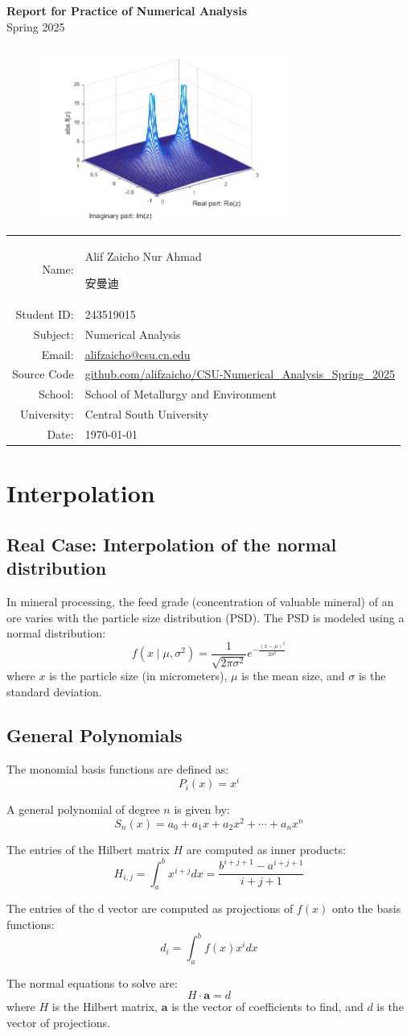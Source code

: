 \documentclass[10pt]{article}
\makeatletter
\newcommand{\makecover}{
  \thispagestyle{empty}
  \begin{center}
    \vspace*{1cm}
    {\LARGE \textbf{Report for Practice of Numerical Analysis}} \\
    \vspace{0.5cm}
    {\Large Spring 2025} \\
    \vspace{2cm}
    
    \begin{figure}[h!]
    \centering
    \includegraphics[width=0.75\textwidth]{figures/anum.png} %
    \end{figure}
    
    \vspace{2cm}
    
    \begin{tabular}{rl}
    \large Name: & \large Alif Zaicho Nur Ahmad \begin{CJK}{UTF8}{gbsn}安曼迪\end{CJK} \\
    \large Student ID: & \large 243519015 \\
    \large Subject: & \large Numerical Analysis \\
    \large Email: & \large \href{mailto:alifzaicho@csu.cn.edu}{alifzaicho@csu.cn.edu} \\
    \large Source Code & \large \href{https://github.com/alifzaicho/CSU-Numerical_Analysis_Spring_2025/tree/39201f506c1db20ce838fc36e13b952caa364c93}{github.com/alifzaicho/CSU-Numerical\_Analysis\_Spring\_2025}\\
    \large School: & \large School of Metallurgy and Environment \\
    \large University: & \large Central South University \\
    \large Date: & \large \today \\
    \end{tabular}
  \end{center}
  \clearpage
}
\makeatother
\begin{document}
\def\imagewidth{1}
\def\imagewidthone{0.75}
\makecover %
\tableofcontents

\section{Interpolation}
\subsection{Real Case: Interpolation of the normal distribution}

In mineral processing, the feed grade (concentration of valuable mineral) of an ore varies with the particle size distribution (PSD). The PSD is modeled using a normal distribution:
\begin{equation}
f(x \mid \mu, \sigma^2) = \frac{1}{\sqrt{2\pi\sigma^2}} 
e^{-\frac{(x - \mu)^2}{2\sigma^2}}
\end{equation}
where \( x \) is the particle size (in micrometers), \(\mu\) is the mean size, and \(\sigma\) is the standard deviation.

\subsection{General Polynomials}

The monomial basis functions are defined as:
\begin{equation}
P_i(x) = x^i
\end{equation}

A general polynomial of degree $ n $ is given by:
\begin{equation}
S_n(x) = a_0 + a_1 x + a_2 x^2 + \cdots + a_n x^n
\end{equation}

The entries of the Hilbert matrix \( H \) are computed as inner products:
\begin{equation}
H_{i,j} = \int_{a}^{b} x^{i+j} dx = \frac{b^{i+j+1} - a^{i+j+1}}{i+j+1}
\end{equation}

The entries of the d vector are computed as projections of \( f(x) \) onto the basis functions:
\begin{equation}
d_i = \int_{a}^{b} f(x) x^i dx
\end{equation}

The normal equations to solve are:
\begin{equation}
H \cdot \mathbf{a} = d
\end{equation}
where \( H \) is the Hilbert matrix, \( \mathbf{a} \) is the vector of coefficients to find, and \( d \) is the vector of projections.
\end{document}
